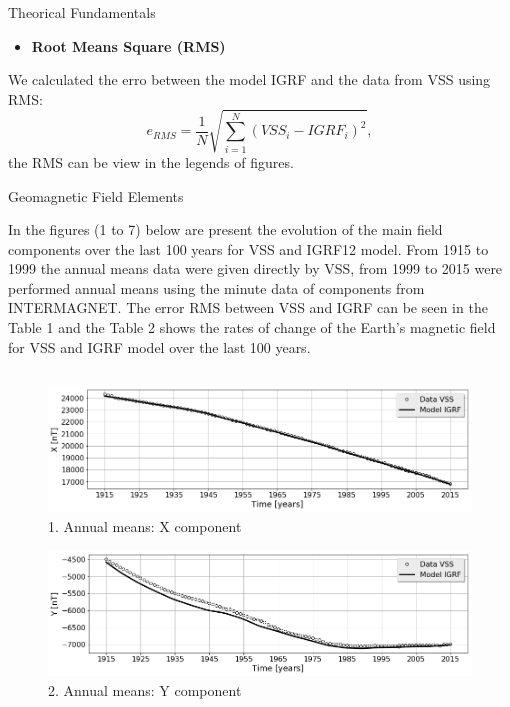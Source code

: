 \documentclass[final,t]{beamer}
\begin{document}
\begin{columns}[t]
\begin{column}{.47\linewidth}
\begin{block}{Theorical Fundamentals}
		\begin{itemize}
			\item 	\textbf{Root Means Square (RMS)}
		\end{itemize}
		We calculated the erro between the model IGRF and the data from VSS using RMS:
		\[e_{RMS}=\frac{1}{N} \sqrt{\sum\limits_{i=1}^{N}(VSS_{i}-IGRF_{i})^{2}}, 
		\]
		the RMS can be view in the legends of figures.
		
		
	\end{block}	



\begin{block}{Geomagnetic Field Elements}
	\justifying
	
In the figures (1 to 7) below are present the evolution of the main field components over the last 100 years for VSS and IGRF12 model. From 1915 to 1999 the  annual means data  were given directly by VSS, from 1999 to 2015 were performed annual means using the minute data of components from INTERMAGNET. The error RMS between VSS and IGRF can be seen in the Table 1 and the Table 2 shows the rates of change of the Earth's magnetic field  for VSS and IGRF model over the last 100 years.
\end{block}

\begin{columns}

\begin{column}{.49\linewidth}

\begin{block}

\begin{figure}
\centering
\includegraphics[scale=0.6]{"figs_ed/X mean all_V3"}
\caption{1. Annual means: X component}
\label{fig:Xmeanall_V3}
\end{figure}
	
	
\begin{figure}
\centering
\includegraphics[scale=0.6]{"figs_ed/Y mean all_v3"}
\caption{2. Annual means: Y component}
\label{fig:Ymeanall_v3}
\end{figure}


\end{block}
\end{column}
\end{columns}
\end{column}
\end{columns}
\end{document}
